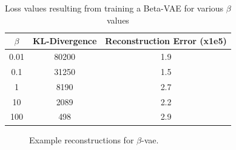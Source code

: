 \begin{table}[!ht]
    \centering
    \caption{Loss values resulting from training a Beta-VAE for various $\beta$ values}
    \label{tab:beta-vae-loss-values}
    \begin{tabular}{ccc}
        \hline
        $\beta$ & KL-Divergence & Reconstruction Error (x1e5) \\
        \hline
        0.01    & 80200         & 1.9                         \\
        0.1     & 31250         & 1.5                         \\
        1       & 8190          & 2.7                         \\
        10      & 2089          & 2.2                         \\
        100     & 498           & 2.9                         \\
        \hline
    \end{tabular}
\end{table}

\begin{figure}[!ht]
    \centering
    \caption{Example reconstructions for $\beta$-vae.}
    \label{fig:beta-vae-recon-examples}
     \quad
\end{figure}


